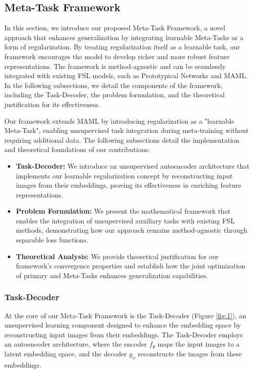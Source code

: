 \subsection{Meta-Task Framework}\label{sec:approach}
In this section, we introduce our proposed Meta-Task Framework, a novel approach that enhances generalization by integrating learnable Meta-Tasks as a form of regularization. By treating regularization itself as a learnable task, our framework encourages the model to develop richer and more robust feature representations. The framework is method-agnostic and can be seamlessly integrated with existing FSL models, such as Prototypical Networks and MAML. In the following subsections, we detail the components of the framework, including the Task-Decoder, the problem formulation, and the theoretical justification for its effectiveness.

Our framework extends MAML \cite{maml} by introducing regularization as a "learnable Meta-Task", enabling unsupervised task integration during meta-training without requiring additional data. The following subsections detail the implementation and theoretical foundations of our contributions:

\begin{itemize}
\item \textbf{Task-Decoder:} We introduce an unsupervised autoencoder architecture that implements our learnable regularization concept by reconstructing input images from their embeddings, proving its effectiveness in enriching feature representations.
\item \textbf{Problem Formulation:} We present the mathematical framework that enables the integration of unsupervised auxiliary tasks with existing FSL methods, demonstrating how our approach remains method-agnostic through separable loss functions.
\item \textbf{Theoretical Analysis:} We provide theoretical justification for our framework's convergence properties and establish how the joint optimization of primary and Meta-Tasks enhances generalization capabilities.
\end{itemize}

\subsubsection{Task-Decoder}

At the core of our Meta-Task Framework is the Task-Decoder (Figure \ref{fig:1}), an unsupervised learning component designed to enhance the embedding space by reconstructing input images from their embeddings. The Task-Decoder employs an autoencoder architecture, where the encoder \( f_{\theta} \) maps the input images to a latent embedding space, and the decoder \( g_{\phi} \) reconstructs the images from these embeddings.


